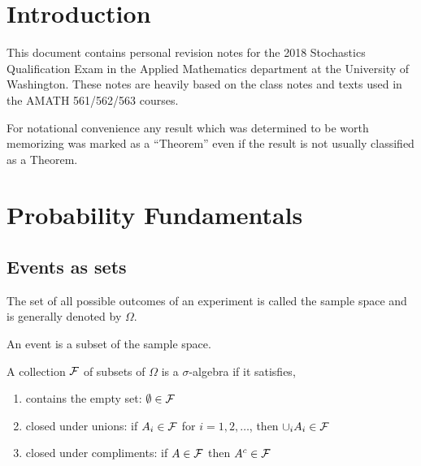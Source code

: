 \documentclass[12pt]{article}
\begin{document}
\maketitle

\pagebreak
\section{Introduction}
This document contains personal revision notes for the 2018 Stochastics Qualification Exam in the Applied Mathematics department at the University of Washington. These notes are heavily based on the class notes \cite{lorig} and texts \cite{grimmett} used in the AMATH 561/562/563 courses.

For notational convenience any result which was determined to be worth memorizing was marked as a ``Theorem'' even if the result is not usually classified as a Theorem.

\tableofcontents

\pagebreak

\section{Probability Fundamentals}
\subsection{Events as sets}
\begin{definition}
The set of all possible outcomes of an experiment is called the sample space and is generally denoted by \( \Omega \).
\end{definition}

\begin{definition}[Event]
    An event is a subset of the sample space.
\end{definition}

\begin{definition}
A collection \( \mathcal{F} \) of subsets of \( \Omega \) is a \( \sigma \)-algebra if it satisfies,
\begin{enumerate}[nolistsep]
    \item contains the empty set: \( \emptyset \in \mathcal{F} \)
    \item closed under unions: if \( A_i \in \mathcal{F} \) for \( i=1,2,\ldots \), then \( \cup_i A_i \in \mathcal{F} \)
    \item closed under compliments: if \( A\in \mathcal{F} \) then \( A^c \in \mathcal{F} \)
\end{enumerate}
\end{definition}
\end{document}
